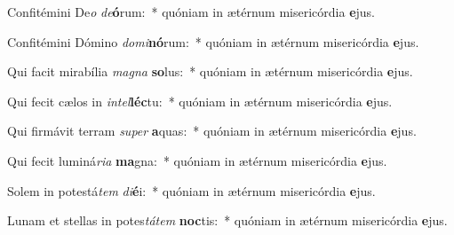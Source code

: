 \item Confitémini De\textit{o} \textit{de}\textbf{ó}rum:~* quóniam in ætérnum misericórdia \textbf{e}jus.
\item Confitémini Dómino \textit{do}\textit{mi}\textbf{nó}rum:~* quóniam in ætérnum misericórdia \textbf{e}jus.
\item Qui facit mirabília \textit{ma}\textit{gna} \textbf{so}lus:~* quóniam in ætérnum misericórdia \textbf{e}jus.
\item Qui fecit cælos in \textit{in}\textit{tel}\textbf{léc}tu:~* quóniam in ætérnum misericórdia \textbf{e}jus.
\item Qui firmávit terram \textit{su}\textit{per} \textbf{a}quas:~* quóniam in ætérnum misericórdia \textbf{e}jus.
\item Qui fecit luminá\textit{ri}\textit{a} \textbf{ma}gna:~* quóniam in ætérnum misericórdia \textbf{e}jus.
\item Solem in potestá\textit{tem} \textit{di}\textbf{é}i:~* quóniam in ætérnum misericórdia \textbf{e}jus.
\item Lunam et stellas in potes\textit{tá}\textit{tem} \textbf{noc}tis:~* quóniam in ætérnum misericórdia \textbf{e}jus.
